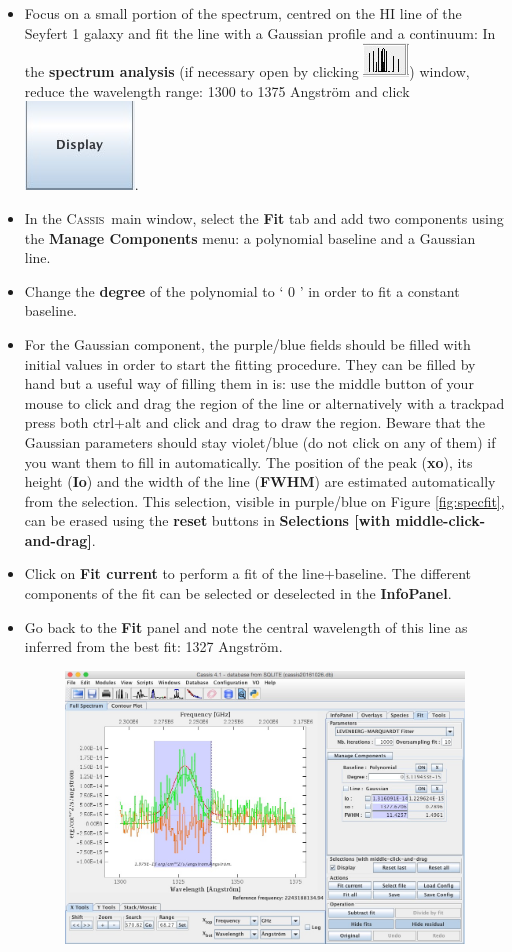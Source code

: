 \documentclass [a4paper, 12pt]{article}
\newcommand{\cassis}{{\textsc{Cassis}}}
\begin{document}
\begin{itemize}
\item Focus on a small portion of the spectrum, centred on the HI line of the 
Seyfert 1 galaxy and fit the line with a Gaussian profile and a continuum: In 
the \textbf{spectrum analysis} (if necessary open by clicking 
\includegraphics[width=0.05  
\textwidth]{../images/cassis_button_spec-analysis.jpg}) window, reduce the 
wavelength range: 
1300 to 1375 Angstr\"om and click \includegraphics[width=0.05  
\textwidth]{../images/cassis_button_display.jpg}.
\item In the \cassis\ main window, select the \textbf{Fit} tab and add two 
components using the \textbf{Manage Components} menu: a polynomial baseline and 
a Gaussian line.
\item Change the \textbf{degree} of the polynomial to ` 0 ' in order to fit a constant baseline.
\item For the Gaussian component, the purple/blue fields should be filled with 
initial values in order to start the fitting procedure. They can be filled by 
hand but a useful way of filling them in is: use the middle button of your 
mouse to click and drag the region of the line or alternatively with a trackpad 
press both ctrl+alt and click and drag to draw the region. Beware that the 
Gaussian parameters should stay violet/blue (do not click on any of them) if 
you want them to fill in automatically. The position of the peak (\textbf{xo}), 
its height (\textbf{Io}) and the width of the line (\textbf{FWHM}) are 
estimated automatically from the selection. This selection, visible in 
purple/blue on Figure \ref{fig:specfit}, can be erased using the \textbf{reset} 
buttons in \textbf{Selections [with middle-click-and-drag]}.
\item Click on \textbf{Fit current} to perform a fit of the line+baseline. The different components of the fit can be selected or deselected in the \textbf{InfoPanel}.
\item Go back to the \textbf{Fit} panel and note the central wavelength of this line as inferred from the best fit: 1327 Angstr\"om. 
\begin{figure}[H]
\center
\includegraphics[width=0.6  \textwidth]{../images/cassis_window_fit-spec.jpg}

\end{figure}
\end{itemize}
\end{document}
